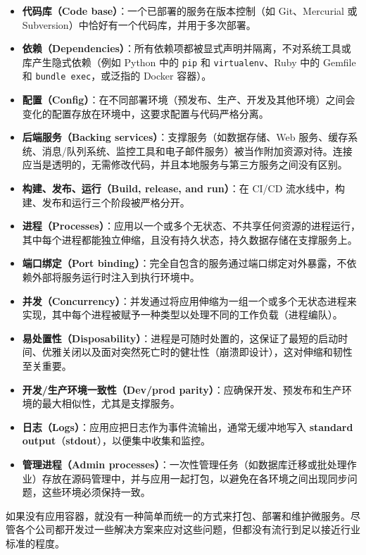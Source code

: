 \begin{itemize}
\item \textbf{代码库（Code base）}：一个已部署的服务在版本控制（如 Git、Mercurial 或 Subversion）中恰好有一个代码库，并用于多次部署。
\item \textbf{依赖（Dependencies）}：所有依赖项都被显式声明并隔离，不对系统工具或库产生隐式依赖（例如 Python 中的 \texttt{pip} 和 \texttt{virtualenv}、Ruby 中的 Gemfile 和 \texttt{bundle exec}，或泛指的 Docker 容器）。
\item \textbf{配置（Config）}：在不同部署环境（预发布、生产、开发及其他环境）之间会变化的配置存放在环境中，这要求配置与代码严格分离。
\item \textbf{后端服务（Backing services）}：支撑服务（如数据存储、Web 服务、缓存系统、消息/队列系统、监控工具和电子邮件服务）被当作附加资源对待。连接应当是透明的，无需修改代码，并且本地服务与第三方服务之间没有区别。
\item \textbf{构建、发布、运行（Build, release, and run）}：在 CI/CD 流水线中，构建、发布和运行三个阶段被严格分开。
\item \textbf{进程（Processes）}：应用以一个或多个无状态、不共享任何资源的进程运行，其中每个进程都能独立伸缩，且没有持久状态，持久数据存储在支撑服务上。
\item \textbf{端口绑定（Port binding）}：完全自包含的服务通过端口绑定对外暴露，不依赖外部将服务运行时注入到执行环境中。
\item \textbf{并发（Concurrency）}：并发通过将应用伸缩为一组一个或多个无状态进程来实现，其中每个进程被赋予一种类型以处理不同的工作负载（进程编队）。
\item \textbf{易处置性（Disposability）}：进程是可随时处置的，这保证了最短的启动时间、优雅关闭以及面对突然死亡时的健壮性（崩溃即设计），这对伸缩和韧性至关重要。
\item \textbf{开发/生产环境一致性（Dev/prod parity）}：应确保开发、预发布和生产环境的最大相似性，尤其是支撑服务。
\item \textbf{日志（Logs）}：应用应把日志作为事件流输出，通常无缓冲地写入 \textbf{standard output}（\textbf{stdout}），以便集中收集和监控。
\label{idx:1720}
\item \textbf{管理进程（Admin processes）}：一次性管理任务（如数据库迁移或批处理作业）存放在源码管理中，并与应用一起打包，以避免在各环境之间出现同步问题，这些环境必须保持一致。
\end{itemize}

\label{idx:1721}
如果没有应用容器，就没有一种简单而统一的方式来打包、部署和维护微服务。尽管各个公司都开发过一些解决方案来应对这些问题，但都没有流行到足以接近行业标准的程度。

